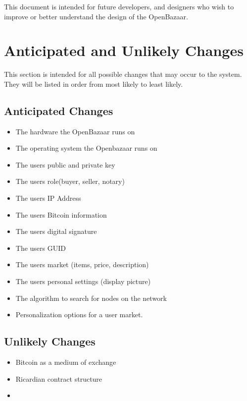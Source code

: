 \documentclass{article}
\begin{document}
This document is intended for future developers, and designers who wish to improve or better understand the design of the OpenBazaar.


\section*{Anticipated and Unlikely Changes}
This section is intended for all possible changes that may occur to the system. They will be listed in order from most likely to least likely.
\newline
\newline
\subsection{Anticipated Changes}
\begin{itemize}
\item
The hardware the OpenBazaar runs on
\item
The operating system the Openbazaar runs on
\item
The users public and private key
\item
The users role(buyer, seller, notary)
\item
The users IP Address
\item
The users Bitcoin information
\item
The users digital signature
\item
The users GUID
\item
The users market (items, price, description)
\item
The users personal settings (display picture)
\item
The algorithm to search for nodes on the network
\item
Personalization options for a user market.
\end{itemize}

\subsection{Unlikely Changes}
\begin{itemize}
\item
Bitcoin as a medium of exchange

\item
Ricardian contract structure

\item

\end{itemize}
\end{document}
